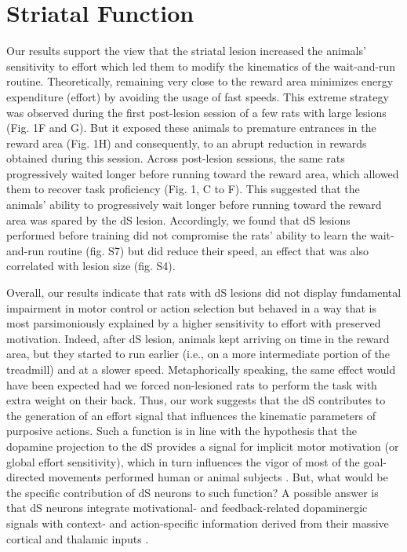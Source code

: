 \section{Striatal Function}
\label{ch:disscusion:lesion}
Our results support the view that the striatal lesion increased the animals' sensitivity to effort which led them to modify the kinematics of the wait-and-run routine.
Theoretically, remaining very close to the reward area minimizes energy expenditure (effort) by avoiding the usage of fast speeds.
This extreme strategy was observed during the first post-lesion session of a few rats with large lesions (Fig. 1F and G).
But it exposed these animals to premature entrances in the reward area (Fig. 1H) and consequently, to an abrupt reduction in rewards obtained during this session.
Across post-lesion sessions, the same rats progressively waited longer before running toward the reward area, which allowed them to recover task proficiency (Fig. 1, C to F).
This suggested that the animals' ability to progressively wait longer before running toward the reward area was spared by the dS lesion.
Accordingly, we found that dS lesions performed before training did not compromise the rats' ability to learn the wait-and-run routine (fig. S7) but did reduce their speed, an effect that was also correlated with lesion size (fig. S4). 
\par
Overall, our results indicate that rats with dS lesions did not display fundamental impairment in motor control or action selection but behaved in a way that is most parsimoniously  explained by a higher sensitivity to effort with preserved motivation.
Indeed, after dS lesion, animals kept arriving on time in the reward area, but they started to run earlier (i.e., on a more intermediate portion of the treadmill) and at a slower speed.
Metaphorically speaking, the same effect would have been expected had we forced non-lesioned rats to perform the task with extra weight on their back. 
Thus, our work suggests that the dS contributes to the generation of an effort signal that influences the kinematic parameters of purposive actions.
Such a function is in line with the hypothesis that the dopamine projection to the dS provides a signal for implicit motor motivation (or global effort sensitivity), which in turn influences the vigor of most of the goal-directed movements performed human or animal subjects \cite{Mazzoni2007JN, Treadway2012JN, Reppert2018JNPhys}.
But, what would be the specific contribution of dS neurons to such function?
A possible answer is that dS neurons integrate motivational- and feedback-related dopaminergic signals with context- and action-specific information derived from their massive cortical and thalamic inputs  \cite{Hunnicutt2016Elife, Hooks2018NatCom}.
